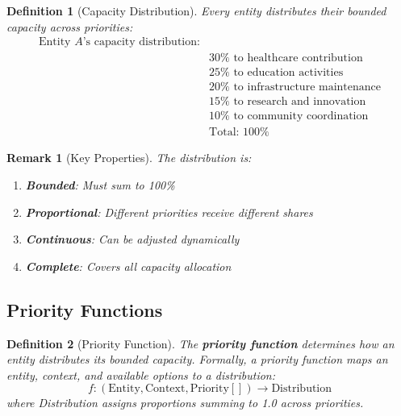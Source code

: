 \documentclass[11pt]{article}
\newtheorem{definition}{Definition}
\newtheorem{remark}{Remark}
\begin{document}
\begin{definition}[Capacity Distribution]
Every entity distributes their bounded capacity across priorities:
\begin{align*}
\text{Entity } A\text{'s capacity distribution:} \\
&30\% \text{ to healthcare contribution} \\
&25\% \text{ to education activities} \\
&20\% \text{ to infrastructure maintenance} \\
&15\% \text{ to research and innovation} \\
&10\% \text{ to community coordination} \\
&\text{Total: } 100\%
\end{align*}
\end{definition}

\begin{remark}[Key Properties]
The distribution is:
\begin{enumerate}
\item \textbf{Bounded}: Must sum to 100\%
\item \textbf{Proportional}: Different priorities receive different shares
\item \textbf{Continuous}: Can be adjusted dynamically
\item \textbf{Complete}: Covers all capacity allocation
\end{enumerate}
\end{remark}

\subsection{Priority Functions}

\begin{definition}[Priority Function]
The \textbf{priority function} determines how an entity distributes its bounded capacity. Formally, a priority function maps an entity, context, and available options to a distribution:
\[
f: (\text{Entity}, \text{Context}, \text{Priority}[]) \to \text{Distribution}
\]
where Distribution assigns proportions summing to 1.0 across priorities.
\end{definition}
\end{document}
